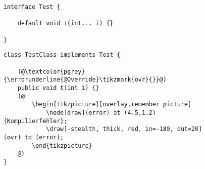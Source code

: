 \begin{figure}[H]
	\noindent
	\begin{adjustbox}{minipage=[t]{.45\linewidth},gstore totalheight=\heightone,margin=\fboxsep+\fboxrule}
		\begin{lstlisting}[caption=Beispiel -- Interfacedeklaration, captionpos=b, label=lst:decl_interface]
interface Test {

	default void t(int... i) {}

}

		\end{lstlisting}
	\end{adjustbox}\hfill
	\begin{adjustbox}{minipage=[t][\heightone]{0.5\linewidth}}
		\begin{lstlisting}[caption=Beispiel -- Kompilierfehler, captionpos=b, label=lst:compiler_error]
class TestClass implements Test {

	(@\textcolor{pgrey}{\errorunderline{@Override}\tikzmark{ovr}{}}@)
	public void t(int i) {}
	(@
		\begin{tikzpicture}[overlay,remember picture]
			\node[draw](error) at (4.5,1.2) {Kompilierfehler};
			\draw[-stealth, thick, red, in=-180, out=20] (ovr) to (error);
		\end{tikzpicture}
	@)
}
		\end{lstlisting}
	\end{adjustbox}
\end{figure}
